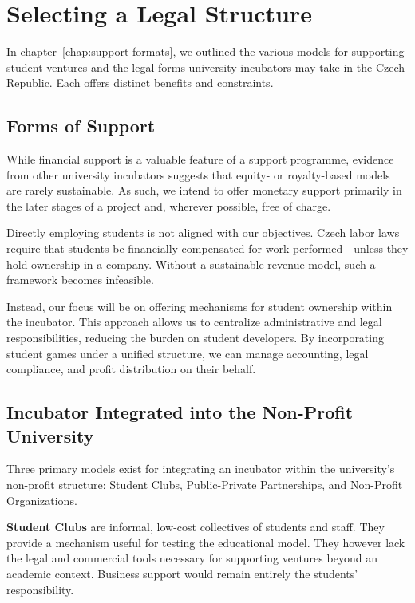 \section{Selecting a Legal Structure}
In chapter~\ref{chap:support-formats}, we outlined the various models for supporting student ventures and the legal forms university incubators may take in the Czech Republic. Each offers distinct benefits and constraints.

\subsection{Forms of Support}
While financial support is a valuable feature of a support programme, evidence from other university incubators suggests that equity- or royalty-based models are rarely sustainable. As such, we intend to offer monetary support primarily in the later stages of a project and, wherever possible, free of charge.

Directly employing students is not aligned with our objectives. Czech labor laws require that students be financially compensated for work performed—unless they hold ownership in a company. Without a sustainable revenue model, such a framework becomes infeasible.

Instead, our focus will be on offering mechanisms for student ownership within the incubator. This approach allows us to centralize administrative and legal responsibilities, reducing the burden on student developers. By incorporating student games under a unified structure, we can manage accounting, legal compliance, and profit distribution on their behalf.

\subsection{Incubator Integrated into the Non-Profit University}
Three primary models exist for integrating an incubator within the university’s non-profit structure: Student Clubs, Public-Private Partnerships, and Non-Profit Organizations.

\textbf{Student Clubs} are informal, low-cost collectives of students and staff. They provide a mechanism useful for testing the educational model. They however lack the legal and commercial tools necessary for supporting ventures beyond an academic context. Business support would remain entirely the students’ responsibility.

